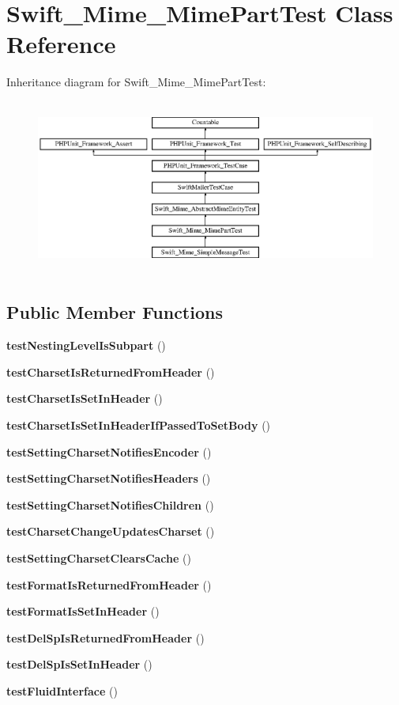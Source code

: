 \section{Swift\+\_\+\+Mime\+\_\+\+Mime\+Part\+Test Class Reference}
\label{class_swift___mime___mime_part_test}
Inheritance diagram for Swift\+\_\+\+Mime\+\_\+\+Mime\+Part\+Test\+:\begin{figure}[H]
\begin{center}
\leavevmode
\includegraphics[height=5.781711cm]{class_swift___mime___mime_part_test}
\end{center}
\end{figure}
\subsection*{Public Member Functions}
\begin{DoxyCompactItemize}
\item 
{\bf test\+Nesting\+Level\+Is\+Subpart} ()
\item 
{\bf test\+Charset\+Is\+Returned\+From\+Header} ()
\item 
{\bf test\+Charset\+Is\+Set\+In\+Header} ()
\item 
{\bf test\+Charset\+Is\+Set\+In\+Header\+If\+Passed\+To\+Set\+Body} ()
\item 
{\bf test\+Setting\+Charset\+Notifies\+Encoder} ()
\item 
{\bf test\+Setting\+Charset\+Notifies\+Headers} ()
\item 
{\bf test\+Setting\+Charset\+Notifies\+Children} ()
\item 
{\bf test\+Charset\+Change\+Updates\+Charset} ()
\item 
{\bf test\+Setting\+Charset\+Clears\+Cache} ()
\item 
{\bf test\+Format\+Is\+Returned\+From\+Header} ()
\item 
{\bf test\+Format\+Is\+Set\+In\+Header} ()
\item 
{\bf test\+Del\+Sp\+Is\+Returned\+From\+Header} ()
\item 
{\bf test\+Del\+Sp\+Is\+Set\+In\+Header} ()
\item 
{\bf test\+Fluid\+Interface} ()
\end{DoxyCompactItemize}
